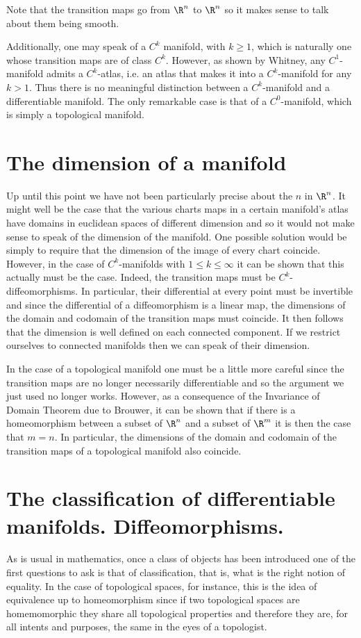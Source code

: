\documentclass[12pt,oneside]{book}
\begin{document}
Note that the transition maps go from \( \R^n \) to \( \R^n \) so it makes sense to talk about them being smooth. 

Additionally, one may speak of a \( C^k \) manifold, with \( k \geq 1 \), which is naturally one whose transition maps are of class \( C^k \). However, as shown by Whitney, any \( C^1 \)-manifold admits a \( C^k \)-atlas, i.e. an atlas that makes it into a \( C^k \)-manifold for any \( k > 1 \). Thus there is no meaningful distinction between a \( C^k \)-manifold and a differentiable manifold. The only remarkable case is that of a \( C^0 \)-manifold, which is simply a topological manifold. 

\section{The dimension of a manifold}
Up until this point we have not been particularly precise about the \( n \) in \( \R^n \). It might well be the case that the various charts maps in a certain manifold's atlas have domains in euclidean spaces of different dimension and so it would not make sense to speak of the dimension of the manifold. One possible solution would be simply to require that the dimension of the image of every chart coincide. However, in the case of \( C^k \)-manifolds with \( 1 \leq k \leq \infty \) it can be shown that this actually must be the case. Indeed, the transition maps must be \( C^k \)-diffeomorphisms. In particular, their differential at every point must be invertible and since the differential of a diffeomorphism is a linear map, the dimensions of the domain and codomain of the transition maps must coincide. It then follows that the dimension is well defined on each connected component. If we restrict ourselves to connected manifolds then we can speak of their dimension. 

In the case of a topological manifold one must be a little more careful since the transition maps are no longer necessarily differentiable and so the argument we just used no longer works. However, as a consequence of the Invariance of Domain Theorem due to Brouwer, it can be shown that if there is a homeomorphism between a subset of \( \R^n \) and a subset of \( \R^m \) it is then the case that \( m = n \). In particular, the dimensions of the domain and codomain of the transition maps of a topological manifold also coincide. 

\section{The classification of differentiable manifolds. Diffeomorphisms.}
As is usual in mathematics, once a class of objects has been introduced one of the first questions to ask is that of classification, that is, what is the right notion of equality. In the case of topological spaces, for instance, this is the idea of equivalence up to homeomorphism since if two topological spaces are homemomorphic they share all topological properties and therefore they are, for all intents and purposes, the same in the eyes of a topologist. 
\end{document}
